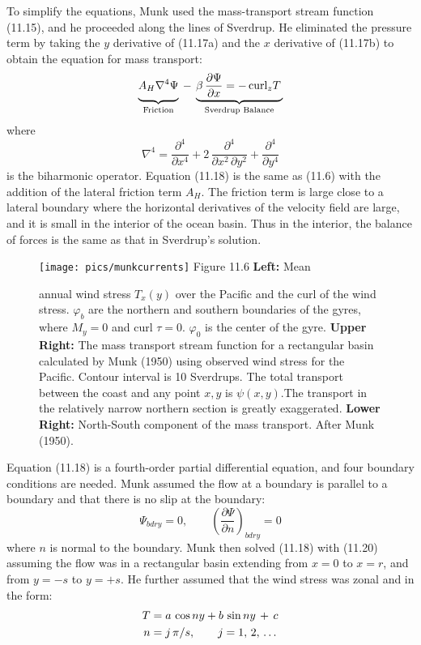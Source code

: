 To simplify the equations, Munk used the mass-transport stream
function (11.15), and he proceeded
along the lines of Sverdrup. He eliminated the pressure term by taking
the $y$ derivative of (11.17a) and the $x$ derivative of (11.17b) to
obtain the equation for mass transport:
\begin{equation}
\underbrace{A_H \nabla^{4}
\Psi\vphantom{\frac{\partial\Psi}{\partial{x}}}}_{\text{Friction}}\:-\:\underbrace{\beta\,\frac{\partial\Psi}{\partial{x}} =-\,\text{curl}_z T
\,}_{\text{Sverdrup Balance}}
\end{equation}
where
\begin{equation}
\nabla^4 =\frac{\partial^4}{\partial{x}^4}+2\,\frac{\partial^4}{\partial{x}^2
\,\partial{y}^2} + \frac{\partial^4}{\partial{y}^4}
\end{equation}
is the biharmonic operator. Equation (11.18) is the same as (11.6)
with the addition of the lateral friction term $A_H$. The friction
term is large close to a lateral boundary where the horizontal
derivatives of the velocity field are large, and it is small in the
interior of the ocean basin. Thus in the interior, the balance of
forces is the same as that in Sverdrup's solution.

\begin{figure}[t!]
\texttt{[image: pics/munkcurrents]}
\footnotesize
Figure 11.6 \textbf{Left:} Mean \rule{0mm}{4ex}annual wind
stress $T_x (y)$ over the Pacific
and the curl of the wind stress. $\varphi _b$ are the northern and
southern boundaries of the gyres, where $M_y = 0$ and curl $\tau = 0$.
$\varphi _0$ is the center of the gyre.  \textbf{Upper Right:} The
mass transport stream function for a
rectangular basin calculated by Munk (1950) using observed wind stress
for the Pacific. Contour interval is 10 Sverdrups. The total transport
between the coast and any point $x,y$ is $\psi (x,y)$.The transport in
the relatively narrow northern section is greatly exaggerated.
\textbf{Lower Right:} North-South component of the mass
transport. After Munk (1950).
\label{fig:munkcurrents}
\vspace{-3ex}
\end{figure}

Equation (11.18) is a fourth-order partial differential equation, and
four boundary conditions are needed. Munk assumed the flow at a
boundary is parallel to a boundary and that there is no slip at the
boundary:
\begin{equation}
\Psi_{bdry} = 0, \qquad \left(\frac{\partial{\Psi}}{\partial{n}}\right)_{bdry} = 0
\end{equation}
where $n$ is normal to the boundary. Munk then solved (11.18) with
(11.20) assuming the flow was in a rectangular basin extending from $x
= 0$ to $x = r$, and from $y = -s$ to $y = +s$. He further assumed
that the wind stress was zonal and in the form:
\begin{align}
T&=a\,\cos ny + b\,\sin ny \,+\, c  \notag \\
n&=j\,\pi/s, \qquad j=1,\,2,\,\dots
\end{align}

